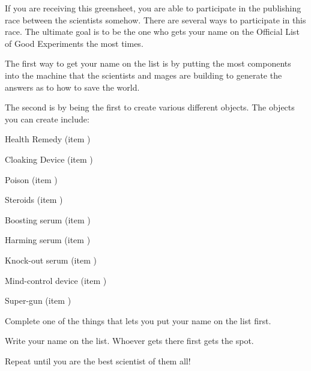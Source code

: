 \documentclass[green]{guildcamp3}
\begin{document}
	
	\name{\gSPublishing{}}
	
	
	
	If you are receiving this greensheet, you are able to participate in the publishing race between the scientists somehow. There are several ways to participate in this race. The ultimate goal is to be the one who gets your name on the Official List of Good Experiments the most times. 
	
	The first way to get your name on the list is by putting the most components into the machine that the scientists and mages are building to generate the answers as to how to save the world.
	
	The second is by being the first to create various different objects. The objects you can create include:

	Health Remedy (item \iHealthRemedy{\MYnumber})
	
	Cloaking Device (item \iCloakingDevice{\MYnumber})
	
	Poison (item \iTruthSerum{\MYnumber})
	
	Steroids (item \iSteroids{\MYnumber})
	
	Boosting serum (item \iCRUpSerum{\MYnumber})
	
	Harming serum (item \iCRDownSerum{\MYnumber})
	
	Knock-out serum (item \iSonicKO{\MYnumber})
	
	Mind-control device (item \iMCDevice{\MYnumber})
	
	Super-gun (item \iUpgradedTechGun{})

	
	\begin{enum}[Directions]
		\item Complete one of the things that lets you put your name on the list first.
		\item Write your name on the list. Whoever gets there first gets the spot. 
		\item Repeat until you are the best scientist of them all!
	\end{enum}
	
	
\end{document}
